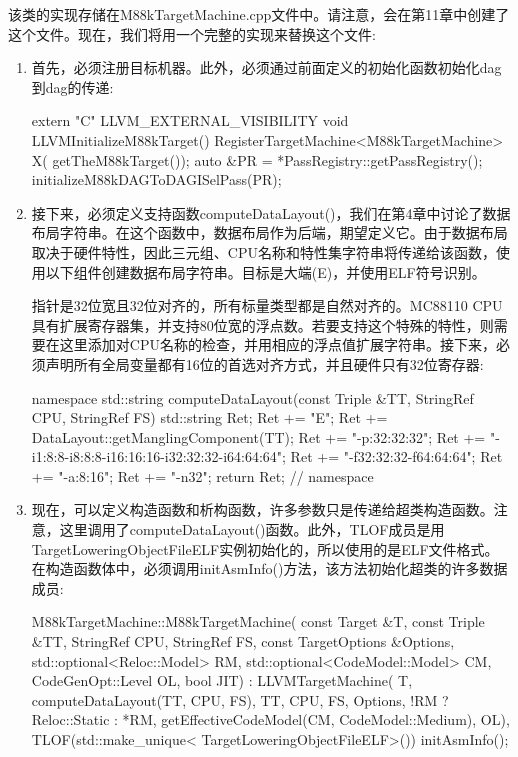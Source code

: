 
该类的实现存储在M88kTargetMachine.cpp文件中。请注意，会在第11章中创建了这个文件。现在，我们将用一个完整的实现来替换这个文件:

\begin{enumerate}
\item
首先，必须注册目标机器。此外，必须通过前面定义的初始化函数初始化dag到dag的传递:

\begin{cpp}
extern "C" LLVM_EXTERNAL_VISIBILITY void
LLVMInitializeM88kTarget() {
    RegisterTargetMachine<M88kTargetMachine> X(
        getTheM88kTarget());
    auto &PR = *PassRegistry::getPassRegistry();
    initializeM88kDAGToDAGISelPass(PR);
}
\end{cpp}

\item
接下来，必须定义支持函数computeDataLayout()，我们在第4章中讨论了数据布局字符串。在这个函数中，数据布局作为后端，期望定义它。由于数据布局取决于硬件特性，因此三元组、CPU名称和特性集字符串将传递给该函数，使用以下组件创建数据布局字符串。目标是大端(E)，并使用ELF符号识别。

指针是32位宽且32位对齐的，所有标量类型都是自然对齐的。MC88110 CPU具有扩展寄存器集，并支持80位宽的浮点数。若要支持这个特殊的特性，则需要在这里添加对CPU名称的检查，并用相应的浮点值扩展字符串。接下来，必须声明所有全局变量都有16位的首选对齐方式，并且硬件只有32位寄存器:

\begin{cpp}
namespace {
std::string computeDataLayout(const Triple &TT,
                              StringRef CPU,
                              StringRef FS) {
    std::string Ret;
    Ret += "E";
    Ret += DataLayout::getManglingComponent(TT);
    Ret += "-p:32:32:32";
    Ret += "-i1:8:8-i8:8:8-i16:16:16-i32:32:32-i64:64:64";
    Ret += "-f32:32:32-f64:64:64";
    Ret += "-a:8:16";
    Ret += "-n32";
    return Ret;
}
} // namespace
\end{cpp}

\item
现在，可以定义构造函数和析构函数，许多参数只是传递给超类构造函数。注意，这里调用了computeDataLayout()函数。此外，TLOF成员是用TargetLoweringObjectFileELF实例初始化的，所以使用的是ELF文件格式。在构造函数体中，必须调用initAsmInfo()方法，该方法初始化超类的许多数据成员:

\begin{cpp}
M88kTargetMachine::M88kTargetMachine(
    const Target &T, const Triple &TT, StringRef CPU,
    StringRef FS, const TargetOptions &Options,
    std::optional<Reloc::Model> RM,
    std::optional<CodeModel::Model> CM,
    CodeGenOpt::Level OL, bool JIT)
    : LLVMTargetMachine(
        T, computeDataLayout(TT, CPU, FS), TT, CPU,
        FS, Options, !RM ? Reloc::Static : *RM,
        getEffectiveCodeModel(CM, CodeModel::Medium),
        OL),
    TLOF(std::make_unique<
        TargetLoweringObjectFileELF>()) {
    initAsmInfo();
}


\end{cpp}
\end{enumerate}
